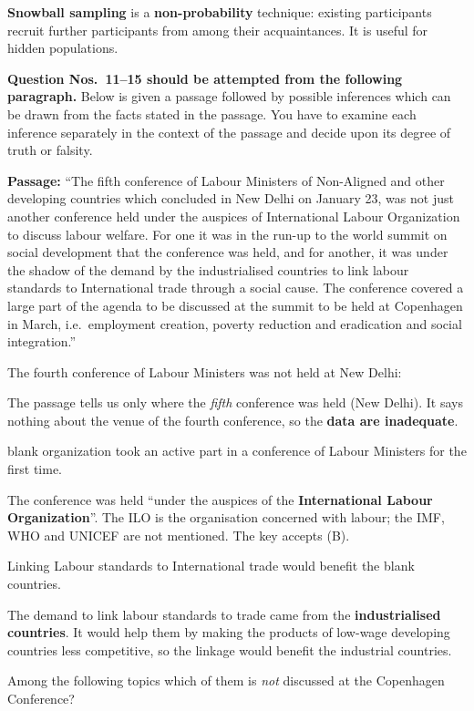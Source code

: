 \textbf{Snowball sampling} is a \textbf{non-probability} technique: existing participants recruit further participants from among their acquaintances. It is useful for hidden populations.

\textbf{Question Nos.~11--15 should be attempted from the following paragraph.} Below is given a passage followed by possible inferences which can be drawn from the facts stated in the passage. You have to examine each inference separately in the context of the passage and decide upon its degree of truth or falsity.\par\smallskip
\textbf{Passage:} ``The fifth conference of Labour Ministers of Non-Aligned and other developing countries which concluded in New Delhi on January 23, was not just another conference held under the auspices of International Labour Organization to discuss labour welfare. For one it was in the run-up to the world summit on social development that the conference was held, and for another, it was under the shadow of the demand by the industrialised countries to link labour standards to International trade through a social cause. The conference covered a large part of the agenda to be discussed at the summit to be held at Copenhagen in March, i.e.\ employment creation, poverty reduction and eradication and social integration.''

The fourth conference of Labour Ministers was not held at New Delhi:

The passage tells us only where the \emph{fifth} conference was held (New Delhi). It says nothing about the venue of the fourth conference, so the \textbf{data are inadequate}.

blank{} organization took an active part in a conference of Labour Ministers for the first time.

The conference was held ``under the auspices of the \textbf{International Labour Organization}''. The ILO is the organisation concerned with labour; the IMF, WHO and UNICEF are not mentioned. The key accepts (B).

Linking Labour standards to International trade would benefit the blank{} countries.

The demand to link labour standards to trade came from the \textbf{industrialised countries}. It would help them by making the products of low-wage developing countries less competitive, so the linkage would benefit the industrial countries.

Among the following topics which of them is \emph{not} discussed at the Copenhagen Conference?

